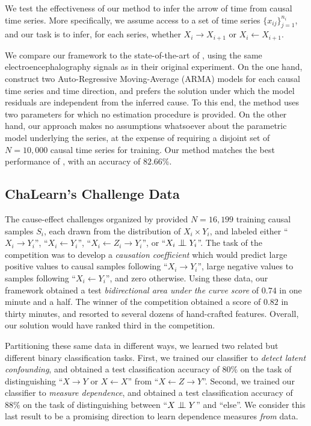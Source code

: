 \documentclass{article}
\newcommand{\indep}{\mathrel{\text{\scalebox{1.07}{$\perp\mkern-10mu\perp$}}}}
\begin{document}
We test the effectiveness of our method to infer the arrow of time from causal
time series. More specifically, we assume access to a set of time series $
\{x_{ij}\}_{j=1}^{n_i}$, and our task is to infer, for each series, whether $X_i
\to X_{i+1}$ or $X_i \leftarrow X_{i+1}$.

We compare our framework to the state-of-the-art of \citet{Peters09}, using the
same electroencephalography signals \citep{EEG} as in their original
experiment.  On the one hand, \citet{Peters09} construct two Auto-Regressive
Moving-Average (ARMA) models for each causal time series and time direction,
and prefers the solution under which the model residuals are independent from
the inferred cause. To this end, the method uses two parameters for which no
estimation procedure is provided.  On the other hand, our approach makes no
assumptions whatsoever about the parametric model underlying the series, at the
expense of requiring a disjoint set of $N=10,000$ causal time series for
training. Our method matches the best performance of \citet{Peters09}, with an
accuracy of $82.66\%$.
 
\subsection{ChaLearn's Challenge Data}

The cause-effect challenges organized by \citet{Codalab14} provided $N =
16,199$ training causal samples $S_i$, each drawn from the distribution of $X_i
\times Y_i$, and labeled either ``$X_i \to Y_i$'', ``$X_i \leftarrow Y_i$'',
``$X_i \leftarrow Z_i \to Y_i$'', or ``$X_i \indep Y_i$''. The task of the
competition was to develop a \emph{causation coefficient} which would predict
large positive values to causal samples following ``$X_i \to Y_i$'', large
negative values to samples following ``$X_i \leftarrow Y_i$'', and zero
otherwise.  Using these data, our framework obtained a test
\textit{bidirectional area under the curve score} \citep{Codalab14} of $0.74$
in one minute and a half.  The winner of the competition obtained a score of
$0.82$ in thirty minutes, and resorted to several dozens of hand-crafted
features. Overall, our solution would have ranked third in the competition.

Partitioning these same data in different ways, we learned two related but
different binary classification tasks. First, we trained our classifier to \emph{detect latent
confounding}, and obtained a test classification accuracy of $80\%$ on the task
of distinguishing ``$X \to Y$ or $X \leftarrow X$'' from ``$X \leftarrow Z \to
Y$''.  Second, we trained our classifier to \emph{measure dependence}, and
obtained a test classification accuracy of $88\%$ on the task of
distinguishing between ``$X \indep Y$'' and ``else''. We consider this last
result to be a promising direction to learn dependence measures
\emph{from} data.
\end{document}
